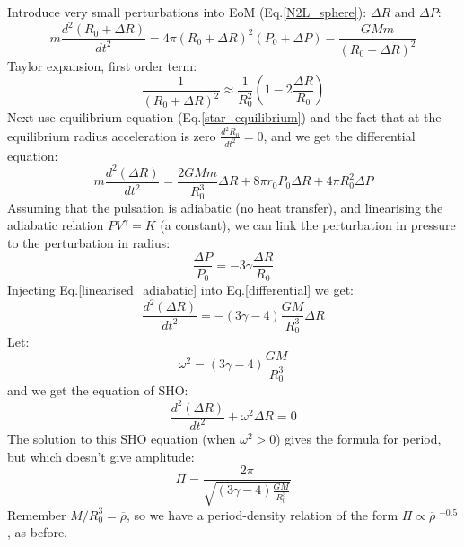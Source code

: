 \documentclass{spy}
\begin{document}
Introduce very small perturbations into EoM (Eq.\ref{N2L_sphere}): \(\Delta R\) and \(\Delta P\): 
\begin{equation}
      m\frac{d^2(R_\mathrm{0} + \Delta R)}{dt^2} = 4 \pi (R_\mathrm{0} + \Delta R)^2 (P_\mathrm{0} + \Delta P) - \frac{GMm}{(R_\mathrm{0} + \Delta R)^2}
\end{equation}
Taylor expansion, first order term:
\begin{equation}
      \frac{1}{(R_\mathrm{0} + \Delta R)^2} \approx \frac{1}{R_\mathrm{0}^2}(1 - 2 \frac{\Delta R}{R_\mathrm{0}})
\end{equation}
Next use equilibrium equation (Eq.\ref{star_equilibrium}) and the fact that at the equilibrium radius acceleration is zero \(\frac{d^2R_\mathrm{0}}{dt^2} = 0\), and we get the differential equation:
\begin{equation}
      m\frac{d^2(\Delta R)}{dt^2} = \frac{2GMm}{R^3_\mathrm{0}}\Delta R + 8\pi r_\mathrm{0} P_\mathrm{0} \Delta R + 4\pi R^2_\mathrm{0} \Delta P
      \label{differential}
\end{equation}
Assuming that the pulsation is adiabatic (no heat transfer), and linearising the adiabatic relation \(PV^\gamma = K\) (a constant), we can link the perturbation in pressure to the perturbation in radius:
\begin{equation}
      \frac{\Delta P }{P_\mathrm{0}} = -3 \gamma \frac{\Delta R}{R_\mathrm{0}}
      \label{linearised_adiabatic}
\end{equation}
Injecting Eq.\ref{linearised_adiabatic} into Eq.\ref{differential} we get:
\begin{equation}
      \frac{d^2(\Delta R)}{dt^2} = -(3\gamma - 4)\frac{GM}{R^3_\mathrm{0}} \Delta R
\end{equation}
Let:
\begin{equation}
      \omega^2 = (3\gamma - 4)\frac{GM}{R^3_\mathrm{0}}
\end{equation}
and we get the equation of SHO:
\begin{equation}
      \frac{d^2(\Delta R)}{dt^2} + \omega^2 \Delta R = 0
\end{equation}
The solution to this SHO equation (when \(\omega^2 > 0\)) gives the formula for period, but which doesn't give amplitude:
\begin{equation}
    \Pi = \frac{2\pi}{\sqrt{(3\gamma - 4)\frac{GM}{R^3_\mathrm{0}}}}
\end{equation}
Remember \(M/R^3_\mathrm{0} = \overline{\rho}\), so we have a period-density relation of the form \(\Pi \propto \overline{\rho} \; ^{-0.5}\), as before. 
\end{document}
